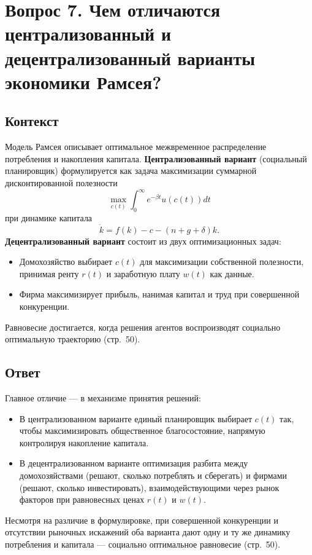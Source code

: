 \section*{Вопрос 7. Чем отличаются централизованный и децентрализованный варианты экономики Рамсея?}

\subsection*{Контекст}
Модель Рамсея описывает оптимальное межвременное распределение потребления и накопления капитала.  
\textbf{Централизованный вариант} (социальный планировщик) формулируется как задача максимизации суммарной дисконтированной полезности
\[
\max_{c(t)}\int_{0}^{\infty} e^{-\beta t}u(c(t))dt
\]
при динамике капитала 
\[
\dot k = f(k)-c-(n+g+\delta)k.
\]
\textbf{Децентрализованный вариант} состоит из двух оптимизационных задач:  
\begin{itemize}
  \item Домохозяйство выбирает \(c(t)\) для максимизации собственной полезности, принимая ренту \(r(t)\) и заработную плату \(w(t)\) как данные.
  \item Фирма максимизирует прибыль, нанимая капитал и труд при совершенной конкуренции.
\end{itemize}
Равновесие достигается, когда решения агентов воспроизводят социально оптимальную траекторию (стр.~50).

\subsection*{Ответ}
Главное отличие — в механизме принятия решений:  
\begin{itemize}
  \item В централизованном варианте единый планировщик выбирает \(c(t)\) так, чтобы максимизировать общественное благосостояние, 
  напрямую контролируя накопление капитала.
  \item В децентрализованном варианте оптимизация разбита между домохозяйствами (решают, сколько потреблять и сберегать) и
   фирмами (решают, сколько инвестировать), взаимодействующими через рынок факторов при равновесных ценах \(r(t)\) и \(w(t)\).
\end{itemize}
Несмотря на различие в формулировке, при совершенной конкуренции и отсутствии рыночных искажений оба варианта дают одну и
 ту же динамику потребления и капитала — социально оптимальное равновесие (стр.~50).

